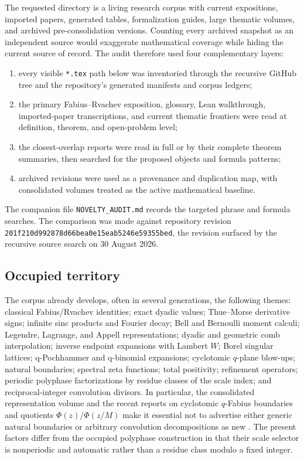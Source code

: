 \documentclass[11pt,oneside]{article}
\numberwithin{equation}{section}
\theoremstyle{definition}
\theoremstyle{remark}
\begin{document}
The requested directory is a living research corpus with current expositions, imported
papers, generated tables, formalization guides, large thematic volumes, and archived
pre-consolidation versions.  Counting every archived snapshot as an independent source
would exaggerate mathematical coverage while hiding the current source of record.  The
audit therefore used four complementary layers:
\begin{enumerate}
\item every visible \texttt{*.tex} path below
 was inventoried through the recursive GitHub tree and
the repository's generated manifests and corpus ledgers;
\item the primary Fabius--Rvachev exposition, glossary, Lean walkthrough, imported-paper
transcriptions, and current thematic frontiers were read at definition, theorem, and
open-problem level;
\item the closest-overlap reports were read in full or by their complete theorem summaries,
then searched for the proposed objects and formula patterns;
\item archived revisions were used as a provenance and duplication map, with consolidated
volumes treated as the active mathematical baseline.
\end{enumerate}
The companion file \texttt{NOVELTY\_AUDIT.md} records the targeted phrase and formula
searches.  The comparison was made against repository revision
\texttt{201f210d992878d66bea0e15eab5246e59355bed}, the revision surfaced by the recursive
source search on 30 August 2026.

\subsection{Occupied territory}

The corpus already develops, often in several generations, the following themes:
classical Fabius/Rvachev identities; exact dyadic values; Thue--Morse derivative signs;
infinite sinc products and Fourier decay; Bell and Bernoulli moment calculi; Legendre,
Lagrange, and Appell representations; dyadic and geometric comb interpolation; inverse
endpoint expansions with Lambert $W$; Borel singular lattices; q-Pochhammer and
q-binomial expansions; cyclotomic $q$-plane blow-ups; natural boundaries; spectral zeta
functions; total positivity; refinement operators; periodic polyphase factorizations by
residue classes of the scale index; and reciprocal-integer convolution divisors.  In
particular, the consolidated representation volume and the recent reports on cyclotomic
$q$-Fabius boundaries and quotients $\Phi(z)/\Phi(z/M)$ make it essential not to advertise
either generic natural boundaries or arbitrary convolution decompositions as new
\cite{RepresentationFrontiers,CyclotomicReport,DivisorReport}.  The present factors differ
from the occupied polyphase construction in that their scale selector is nonperiodic and
automatic rather than a residue class modulo a fixed integer.
\end{document}
